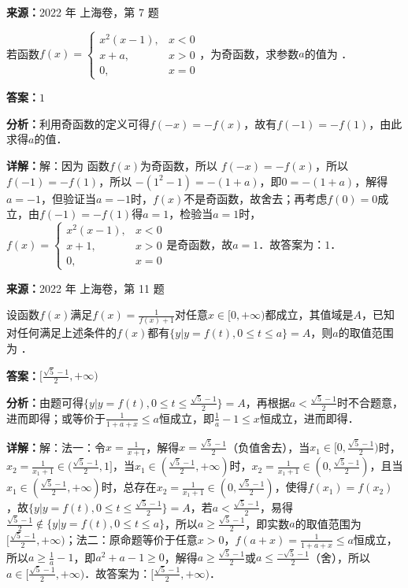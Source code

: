 \begin{question}[points=5]
\textbf{来源：}2022 年 上海卷，第 7 题\par
若函数$f(x)=\begin{cases} x^2(x-1), & x<0 \\ x+a, & x>0 \\ 0, & x=0 \end{cases}$，为奇函数，求参数$a$的值为 ．
\fillin[{$1$}]
\begin{solution}
\textbf{答案：}$1$

\textbf{分析：}利用奇函数的定义可得$f(-x)=-f(x)$，故有$f(-1)=-f(1)$，由此求得$a$的值．

\textbf{详解：}解：因为 函数$f(x)$为奇函数，所以 $f(-x)=-f(x)$，所以 $f(-1)=-f(1)$，所以 $-(1^2-1)=-(1+a)$，即$0=-(1+a)$，解得$a=-1$，但验证当$a=-1$时，$f(x)$不是奇函数，故舍去；再考虑$f(0)=0$成立，由$f(-1)=-f(1)$得$a=1$，检验当$a=1$时，$f(x)=\begin{cases} x^2(x-1), & x<0 \\ x+1, & x>0 \\ 0, & x=0 \end{cases}$是奇函数，故$a=1$．故答案为：$1$．
\end{solution}
\end{question}

\begin{question}[points=5]
\textbf{来源：}2022 年 上海卷，第 11 题\par
设函数$f(x)$满足$f(x)=\frac{1}{f(x)+1}$对任意$x\in[0,+\infty)$都成立，其值域是$A$，已知对任何满足上述条件的$f(x)$都有$\{y|y=f(t),0\leq t\leq a\}=A$，则$a$的取值范围为 ．
\fillin[{$[\frac{\sqrt{5}-1}{2},+\infty)$}]
\begin{solution}
\textbf{答案：}$[\frac{\sqrt{5}-1}{2},+\infty)$

\textbf{分析：}由题可得$\{y|y=f(t),0\leq t\leq \frac{\sqrt{5}-1}{2}\}=A$，再根据$a<\frac{\sqrt{5}-1}{2}$时不合题意，进而即得；或等价于$\frac{1}{1+a+x}\leq a$恒成立，即$\frac{1}{a}-1\leq x$恒成立，进而即得．

\textbf{详解：}解：法一：令$x=\frac{1}{x+1}$，解得$x=\frac{\sqrt{5}-1}{2}$（负值舍去），当$x_1\in[0,\frac{\sqrt{5}-1}{2})$时，$x_2=\frac{1}{x_1+1}\in(\frac{\sqrt{5}-1}{2},1]$，当$x_1\in(\frac{\sqrt{5}-1}{2},+\infty)$时，$x_2=\frac{1}{x_1+1}\in(0,\frac{\sqrt{5}-1}{2})$，且当$x_1\in(\frac{\sqrt{5}-1}{2},+\infty)$时，总存在$x_2=\frac{1}{x_1+1}\in(0,\frac{\sqrt{5}-1}{2})$，使得$f(x_1)=f(x_2)$，故$\{y|y=f(t),0\leq t\leq \frac{\sqrt{5}-1}{2}\}=A$，若$a<\frac{\sqrt{5}-1}{2}$，易得$\frac{\sqrt{5}-1}{2}\notin\{y|y=f(t),0\leq t\leq a\}$，所以$a\geq\frac{\sqrt{5}-1}{2}$，即实数$a$的取值范围为$[\frac{\sqrt{5}-1}{2},+\infty)$；法二：原命题等价于任意$x>0$，$f(a+x)=\frac{1}{1+a+x}\leq a$恒成立，所以$a\geq\frac{1}{a}-1$，即$a^2+a-1\geq0$，解得$a\geq\frac{\sqrt{5}-1}{2}$或$a\leq\frac{-\sqrt{5}-1}{2}$（舍），所以$a\in[\frac{\sqrt{5}-1}{2},+\infty)$．故答案为：$[\frac{\sqrt{5}-1}{2},+\infty)$．
\end{solution}
\end{question}

